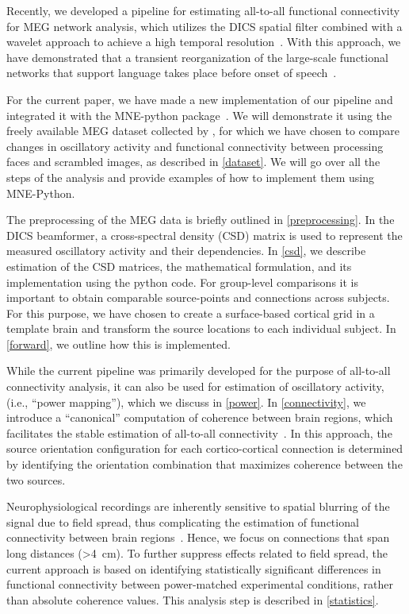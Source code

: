 \documentclass[utf8]{frontiersSCNS}
\renewcommand{\cite}[1]{~\citep{#1}}
\newcommand{\textcite}[1]{\citet{#1}}
\begin{document}
Recently, we developed a pipeline for estimating all-to-all functional connectivity\cite{Liljestrom2015a, Saarinen2015} for MEG network analysis, which utilizes the DICS spatial filter combined with a wavelet approach to achieve a high temporal resolution\cite{Laaksonen2012a}.
With this approach, we have demonstrated that a transient reorganization of the large-scale functional networks that support language takes place before onset of speech\cite{Liljestrom2015a, Liljestrom2015b}.

For the current paper, we have made a new implementation of our pipeline and integrated it with the MNE-python package\cite{mne}.
We will demonstrate it using the freely available MEG dataset collected by \textcite{Wakeman2015}, for which we have chosen to compare changes in oscillatory activity and functional connectivity between processing faces and scrambled images, as described in \autoref{dataset}.
We will go over all the steps of the analysis and provide examples of how to implement them using MNE-Python.

The preprocessing of the MEG data is briefly outlined in \autoref{preprocessing}. 
In the DICS beamformer, a cross-spectral density (CSD) matrix is used to represent the measured oscillatory activity and their dependencies.
In \autoref{csd}, we describe estimation of the CSD matrices, the mathematical formulation, and its implementation using the python code.
For group-level comparisons it is important to obtain comparable source-points and connections across subjects.
For this purpose, we have chosen to create a surface-based cortical grid in a template brain and transform the source locations to each individual subject.
In \autoref{forward}, we outline how this is implemented.

While the current pipeline was primarily developed for the purpose of all-to-all connectivity analysis, it can also be used for estimation of oscillatory activity, (i.e., ``power mapping''), which we discuss in \autoref{power}.
In \autoref{connectivity}, we introduce a ``canonical'' computation of coherence between brain regions, which facilitates the stable estimation of all-to-all connectivity\cite{Saarinen2015}.
In this approach, the source orientation configuration for each cortico-cortical connection is determined by identifying the orientation combination that maximizes coherence between the two sources.

Neurophysiological recordings are inherently sensitive to spatial blurring of the signal due to field spread, thus complicating the estimation of functional connectivity between brain regions\cite{Schoffelen2009a}.
Hence, we focus on connections that span long distances (\SI{>4}{\centi\meter}).
To further suppress effects related to field spread, the current approach is based on identifying statistically significant differences in functional connectivity between power-matched experimental conditions, rather than absolute coherence values.
This analysis step is described in \autoref{statistics}.
\end{document}
